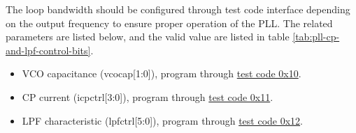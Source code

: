 \documentclass[main\_\_EN.tex]{subfiles}
\begin{document}
The loop bandwidth should be configured through test code interface depending on the output frequency to ensure proper operation of the PLL. The related parameters are listed below, and the valid value are listed in table \ref{tab:pll-cp-and-lpf-control-bits}.

\begin{itemize}
    \item VCO capacitance (vcocap[1:0]), program through \hyperref[sec:test-code-0x10]{test code 0x10}.
    \item CP current (icpctrl[3:0]), program through \hyperref[sec:test-code-0x11]{test code 0x11}.
    \item LPF characteristic (lpfctrl[5:0]), program through \hyperref[sec:test-code-0x12]{test code 0x12}.
\end{itemize}
\end{document}
